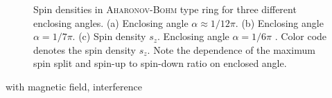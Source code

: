 \begin{figure}[h!]
  \caption{Spin densities in \textsc{Aharonov-Bohm} type ring for three different enclosing angles. (a) Enclosing angle $\alpha\approx 1/12 \pi$. (b) Enclosing angle $\alpha=1/7\pi$. (c) Spin density $s_z$. Enclosing angle $\alpha=1/6\pi$ . Color code denotes the spin density $s_z$. Note the dependence of the maximum spin split and spin-up to spin-down ratio on enclosed angle.}
\end{figure}
 with magnetic field, interference \cite{Nitta2002PhysicaE.12.753}
